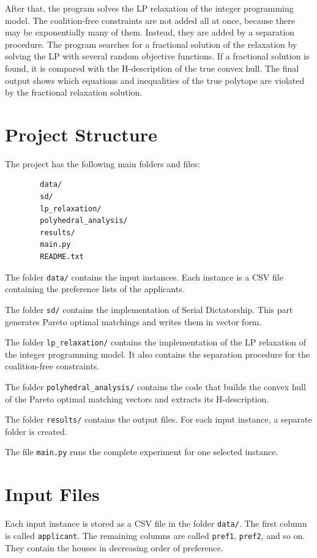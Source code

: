 \documentclass[12pt]{report}
\numberwithin{algorithm}{chapter}
\begin{document}
	After that, the program solves the LP relaxation of the integer programming model. The coalition-free constraints are not added all at once, because there may be exponentially many of them. Instead, they are added by a separation procedure. The program searches for a fractional solution of the relaxation by solving the LP with several random objective functions. If a fractional solution is found, it is compared with the H-description of the true convex hull. The final output shows which equations and inequalities of the true polytope are violated by the fractional relaxation solution.
	
	\section{Project Structure}
	
	The project has the following main folders and files:
	
	\begin{verbatim}
		data/
		sd/
		lp_relaxation/
		polyhedral_analysis/
		results/
		main.py
		README.txt
	\end{verbatim}
	
	The folder \texttt{data/} contains the input instances. Each instance is a CSV file containing the preference lists of the applicants.
	
	The folder \texttt{sd/} contains the implementation of Serial Dictatorship. This part generates Pareto optimal matchings and writes them in vector form.
	
	The folder \texttt{lp\_relaxation/} contains the implementation of the LP relaxation of the integer programming model. It also contains the separation procedure for the coalition-free constraints.
	
	The folder \texttt{polyhedral\_analysis/} contains the code that builds the convex hull of the Pareto optimal matching vectors and extracts its H-description.
	
	The folder \texttt{results/} contains the output files. For each input instance, a separate folder is created.
	
	The file \texttt{main.py} runs the complete experiment for one selected instance.
	
	\section{Input Files}
	
	Each input instance is stored as a CSV file in the folder \texttt{data/}. The first column is called \texttt{applicant}. The remaining columns are called \texttt{pref1}, \texttt{pref2}, and so on. They contain the houses in decreasing order of preference.
	
\end{document}
